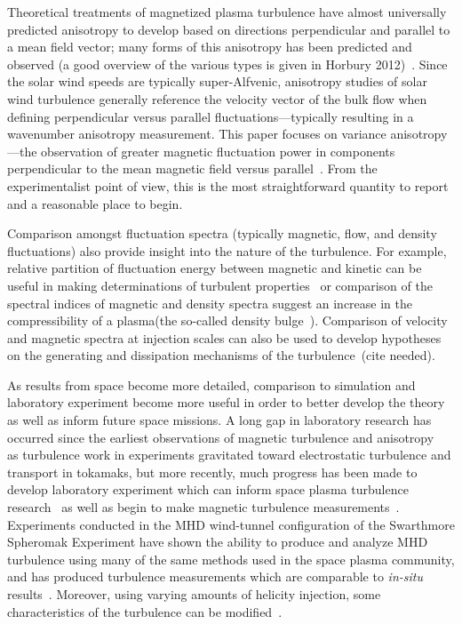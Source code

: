 \documentclass[aip,prl,amsmath,amssymb,reprint,superscriptaddress]{revtex4-1} %
\begin{document}
Theoretical treatments of magnetized plasma turbulence have almost universally predicted anisotropy to develop based on directions perpendicular and parallel to a mean field vector; many forms of this anisotropy has been predicted and observed (a good overview of the various types is given in Horbury 2012)~\cite{horbury12}. Since the solar wind speeds are typically super-Alfvenic, anisotropy studies of solar wind turbulence generally reference the velocity vector of the bulk flow when defining perpendicular versus parallel fluctuations---typically resulting in a wavenumber anisotropy measurement. This paper focuses on variance anisotropy---the observation of greater magnetic fluctuation power in components perpendicular to the mean magnetic field versus parallel~\cite{belcher71}. From the experimentalist point of view, this is the most straightforward quantity to report and a reasonable place to begin.

Comparison amongst fluctuation spectra (typically magnetic, flow, and density fluctuations) also provide insight into the nature of the turbulence. For example, relative partition of fluctuation energy between magnetic and kinetic can be useful in making determinations of turbulent properties~\cite{podesta07} or comparison of the spectral indices of magnetic and density spectra suggest an increase in the compressibility of a plasma(the so-called density bulge~\cite{harmon05}). Comparison of velocity and magnetic spectra at injection scales can also be used to develop hypotheses on the generating and dissipation mechanisms of the turbulence~\cite{}(cite needed).

As results from space become more detailed, comparison to simulation and laboratory experiment become more useful in order to better develop the theory as well as inform future space missions. A long gap in laboratory research has occurred since the earliest observations of magnetic turbulence and anisotropy~\cite{robinson71} as turbulence work in experiments gravitated toward electrostatic turbulence and transport in tokamaks, but more recently, much progress has been made to develop laboratory experiment which can inform space plasma turbulence research~\cite{howes12a} as well as begin to make magnetic turbulence measurements~\cite{ren11}. Experiments conducted in the MHD wind-tunnel configuration of the Swarthmore Spheromak Experiment have shown the ability to produce and analyze MHD turbulence using many of the same methods used in the space plasma community, and has produced turbulence measurements which are comparable to \textit{in-situ} results~\cite{schaffner14a}. Moreover, using varying amounts of helicity injection, some characteristics of the turbulence can be modified~\cite{schaffner14b}.
\end{document}
